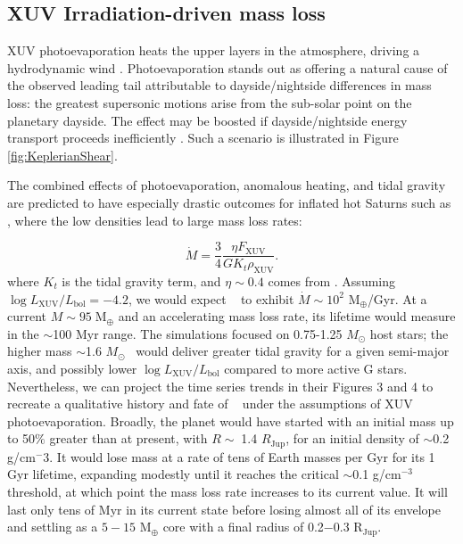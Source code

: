 \documentclass[twocolumn]{aastex631}
\newcommand{\hatp}{\object{HAT-P-67}~}
\newcommand{\hatpb}{\object{HAT-P-67 b}}
\begin{document}
\subsection{XUV Irradiation-driven mass loss}
XUV photoevaporation heats the upper layers in the atmosphere, driving a hydrodynamic wind \citep{2009ApJ...693...23M}.  Photoevaporation stands out as offering a natural cause of the observed leading tail attributable to dayside/nightside differences in mass loss: the greatest supersonic motions arise from the sub-solar point on the planetary dayside.  The effect may be boosted if dayside/nightside energy transport proceeds inefficiently \citep{2009ApJ...693...23M}.  Such a scenario is illustrated in Figure \ref{fig:KeplerianShear}.

The combined effects of photoevaporation, anomalous heating, and tidal gravity are predicted to have especially drastic outcomes for inflated hot Saturns \citep{2023ApJ...945L..36T} such as \hatpb, where the low densities lead to large mass loss rates:

\begin{equation}
    \dot{M} = \frac{3}{4}\frac{\eta F_\mathrm{XUV}}{G K_t \rho_\mathrm{XUV}}\label{thorn23Mdot}.
\end{equation}
 where $K_t$ is the tidal gravity term, and $\eta \sim 0.4$ comes from \citet{2022A&A...663A.122C}.  Assuming $\log{L_\mathrm{XUV}/L_\mathrm{bol}}=-4.2$, we would expect \hatpb~ to exhibit $\dot{M}\sim10^2$ M$_\oplus$/Gyr. At a current $M\sim95\;$M$_\oplus$ and an accelerating mass loss rate, its lifetime would measure in the $\sim$100 Myr range.  The \citet{2023ApJ...945L..36T} simulations focused on 0.75-1.25 $M_\odot$ host stars; the higher mass $\sim$1.6 $M_\odot$ \hatp would deliver greater tidal gravity for a given semi-major axis, and possibly lower $\log{L_\mathrm{XUV}/L_\mathrm{bol}}$ compared to more active G stars.  Nevertheless, we can project the time series trends in their Figures 3 and 4 to recreate a qualitative history and fate of \hatpb~ under the assumptions of XUV photoevaporation.  Broadly, the planet would have started with an initial mass up to 50$\%$ greater than at present, with $R\sim\;$1.4 $R_\mathrm{Jup}$, for an initial density of $\sim$0.2 g/cm$^-3$.  It would lose mass at a rate of tens of Earth masses per Gyr for its 1 Gyr lifetime, expanding modestly until it reaches the critical $\sim$0.1 g/cm$^{-3}$ threshold, at which point the mass loss rate increases to its current value.  It will last only tens of Myr in its current state before losing almost all of its envelope and settling as a $5-15$ M$_\oplus$ core with a final radius of 0.2$-$0.3 R$_\mathrm{Jup}$.
\end{document}
